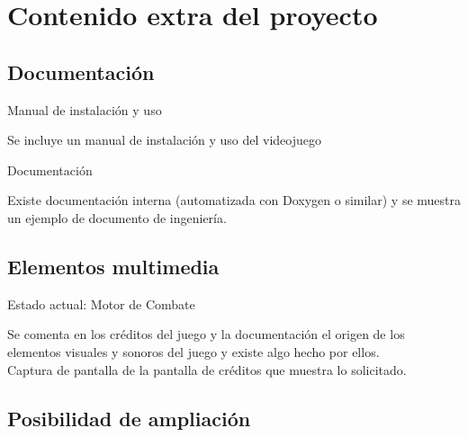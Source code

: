\documentclass[9pt,xcolor=svgnames]{beamer}
\begin{document}
 \section{Contenido extra del proyecto}

  \subsection{Documentación}

   \begin{frame}{Manual de instalación y uso}
    \transdissolve
    
    Se incluye un manual de instalación y uso del videojuego
   \end{frame}


   \begin{frame}{Documentación}
    \transdissolve
    
    Existe documentación interna (automatizada con Doxygen o similar) y
    se muestra un ejemplo de documento de ingeniería.

   \end{frame}


   \subsection{Elementos multimedia}

   \begin{frame}{Estado actual: Motor de Combate}
   \transdissolve

    Se comenta en los créditos del juego y la documentación el origen de
    los elementos visuales y sonoros del juego y existe algo hecho por
    ellos.\\

    Captura de pantalla de la pantalla de créditos que muestra lo
    solicitado.
   \end{frame}



  \subsection{Posibilidad de ampliación}
\end{document}
